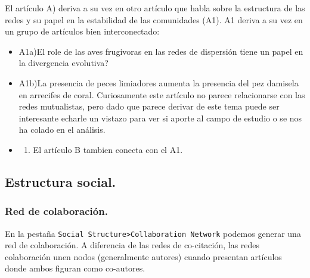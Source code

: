 \documentclass[
]{article}
\providecommand{\tightlist}{%
  \setlength{\itemsep}{0pt}\setlength{\parskip}{0pt}}
\begin{document}
El artículo A) deriva a su vez en otro artículo que habla sobre la
estructura de las redes y su papel en la estabilidad de las comunidades
(A1). A1 deriva a su vez en un grupo de artículos bien interconectado:

\begin{itemize}
\item
  A1a)El role de las aves frugivoras en las redes de dispersión tiene un
  papel en la divergencia evolutiva?
\item
  A1b)La presencia de peces limiadores aumenta la presencia del pez
  damisela en arrecifes de coral. Curiosamente este artículo no parece
  relacionarse con las redes mutualistas, pero dado que parece derivar
  de este tema puede ser interesante echarle un vistazo para ver si
  aporte al campo de estudio o se nos ha colado en el análisis.
\item
  \begin{enumerate}
  \def\labelenumi{\Alph{enumi})}
  \setcounter{enumi}{1}
  \tightlist
  \item
    El artículo B tambien conecta con el A1.
  \end{enumerate}
\end{itemize}

\hypertarget{estructura-social.}{%
\subsection{Estructura social.}\label{estructura-social.}}

\hypertarget{red-de-colaboraciuxf3n.}{%
\subsubsection{Red de colaboración.}\label{red-de-colaboraciuxf3n.}}

En la pestaña
\texttt{Social\ Structure\textgreater{}Collaboration\ Network} podemos
generar una red de colaboración. A diferencia de las redes de
co-citación, las redes colaboración unen nodos (generalmente autores)
cuando presentan artículos donde ambos figuran como co-autores.
\end{document}
